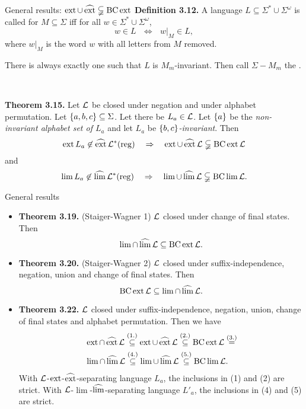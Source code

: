 \documentclass[
	handout,
	notheorems,noamsthm]{beamer}
\begin{document}
\begin{frame}[<+->]{General results: $\operatorname{ext} \cup \operatorname{\widehat{ext}} \subsetneqq \operatorname{BC} \operatorname{ext}$}
\textbf{Definition 3.12.} A language $L \subseteq \Sigma^* \cup \Sigma^\omega$ is called  for $M \subseteq\Sigma$ iff for all $w \in \Sigma^* \cup \Sigma^\omega$,
\[ w \in L \ \ \ \Leftrightarrow \ \ \  w |_M \in L , \]
where $w|_M$ is the word $w$ with all letters from $M$ removed.

There is always exactly one  such that $L$ is $M_m$-invariant. Then call $\Sigma-M_m$ the .

\

\textbf{Theorem 3.15.} Let $\mathcal{L}$ be closed under negation and under alphabet permutation. Let $\Set{a,b,c} \subseteq \Sigma$. Let there be $L_a \in \mathcal{L}$. Let $\Set{a}$ be the \emph{non-invariant alphabet set of $L_a$} and let $L_a$ be \emph{$\Set{b,c}$-invariant}. Then
\[ \ext L_a \not\in \dext \Langreg \ \ \ \Rightarrow \ \ \ \ext \cup \dext \Lang \subsetneqq \BC \ext \Lang \]
and
\[ \lim L_a \not\in \operatorname{\widehat{lim}} \mathcal{L}^*(\textup{\textrm{reg}}) \ \ \ \Rightarrow \ \ \ \lim \cup \operatorname{\widehat{lim}} \mathcal{L} \subsetneqq \operatorname{BC} \lim \mathcal{L} . \]
\end{frame}

\begin{frame}[<+->]{General results}
\begin{itemize}
\item \textbf{Theorem 3.19.} (Staiger-Wagner 1) $\mathcal{L}$ closed under change of final states. Then
\[ \lim \cap \operatorname{\widehat{lim}} \mathcal{L} \subseteq \operatorname{BC} \operatorname{ext} \mathcal{L} . \]
\item \textbf{Theorem 3.20.} (Staiger-Wagner 2) $\mathcal{L}$ closed under suffix-independence, negation, union and change of final states. Then
\[ \operatorname{BC} \operatorname{ext} \mathcal{L} \subseteq \lim \cap \operatorname{\widehat{lim}} \mathcal{L} . \]
\item \textbf{Theorem 3.22.} $\mathcal{L}$ closed under suffix-independence, negation, union, change of final states and alphabet permutation.
Then we have
\begin{align*}
& \operatorname{ext} \cap \operatorname{\widehat{ext}} \mathcal{L} \stackrel{(1.)}\subseteq
\operatorname{ext} \cup \operatorname{\widehat{ext}} \mathcal{L} \stackrel{(2.)}\subseteq
\operatorname{BC} \operatorname{ext} \mathcal{L} \stackrel{(3.)}= \\
& \lim \cap \operatorname{\widehat{lim}} \mathcal{L} \stackrel{(4.)}\subseteq
\lim \cup \operatorname{\widehat{lim}} \mathcal{L} \stackrel{(5.)}\subseteq
\operatorname{BC} \lim \mathcal{L} .
\end{align*}
With $\mathcal{L}$-$\operatorname{ext}$-$\operatorname{\widehat{ext}}$-separating language $L_a$, the inclusions in (1) and (2) are strict.
With $\mathcal{L}$-$\lim$-$\operatorname{\widehat{lim}}$-separating language $L'_a$, the inclusions in (4) and (5) are strict.\end{itemize}
\end{frame}
\end{document}
